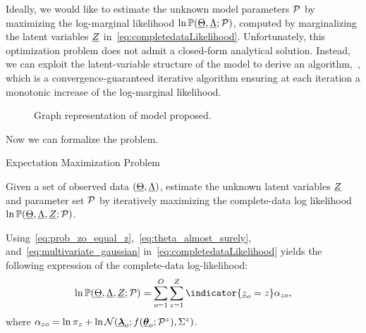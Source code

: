 \documentclass{ifacconf}  %
\begin{document}
Ideally, we would like to estimate the unknown model parameters $\mathcal{P}$ by maximizing the log-marginal likelihood $\ln \mathbb{P}(\underline{\Theta},\underline{\Lambda};\mathcal{P})$, computed by marginalizing the latent variables $\underline{Z}$ in~\eqref{eq:completedataLikelihood}.
Unfortunately, this optimization problem does not admit a closed-form analytical solution.
Instead, we can exploit the latent-variable structure of the model to derive an \EM{} algorithm,~\cite{DempsterEtAl1977}, which is a convergence-guaranteed iterative algorithm ensuring at each iteration a monotonic increase of the log-marginal likelihood.

\begin{figure}[b]
  \centering
  \caption{Graph representation of model proposed.}\label{fig:model}
\end{figure}

Now we can formalize the \EM{} problem.
\begin{problem}{Expectation Maximization Problem}\label{pb:EM}

  Given a set of observed data $(\underline{\Theta},\underline{\Lambda})$, estimate the unknown latent variables $\underline{Z}$ and parameter set $\mathcal{P}$ by iteratively maximizing  the complete-data log likelihood $\ln\mathbb{P}(\underline{\Theta},\underline{\Lambda},\underline{Z};\mathcal{P})$.
\end{problem}

Using~\eqref{eq:prob_zo_equal_z},~\eqref{eq:theta_almost_surely}, and~\eqref{eq:multivariate_gaussian} in~\eqref{eq:completedataLikelihood} yields {\color{blue}the following expression of the complete-data log-likelihood:}
\begin{equation}\label{eq:completedataLogLikelihood_complete}
\ln\probability{\random{\Theta},\random{\Lambda},\random{Z};\set{P}}=  \sum_{o=1}^{O}\sum_{z=1}^{Z}{\indicator{\random{z}_{o}=z}}
  \alpha_{zo},
\end{equation}
where ${\alpha_{zo}=\ln{\pi_{z}}+\ln{\mathcal{N}({\underline{\boldsymbol{\lambda}}}_{o};f({\underline{\boldsymbol{\theta}}}_{o};\mathcal{P}^{z}),{\Sigma^{z}})}}$.
\end{document}
